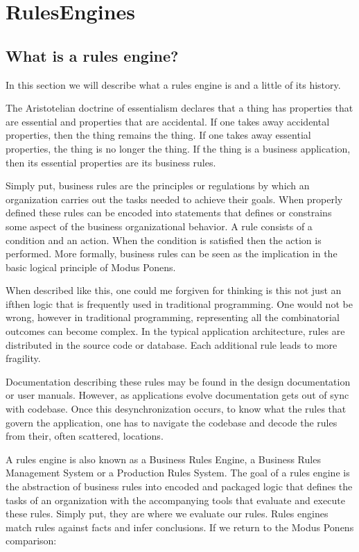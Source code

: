 \section{RulesEngines}

\subsection{What is a rules engine?}

In this section we will describe what a rules engine is and a little of its history.

The Aristotelian doctrine of essentialism declares that a thing has properties that are essential and properties that are accidental.
If one takes away accidental properties, then the thing remains the thing.
If one takes away essential properties, the thing is no longer the thing.
If the thing is a business application, then its essential properties are its business rules.


Simply put, business rules are the principles or regulations by which an organization carries out the tasks needed to achieve their goals.
When properly defined these rules can be encoded into statements that defines or constrains some aspect of the business organizational behavior.
A rule consists of a condition and an action.
When the condition is satisfied then the action is performed.
More formally, business rules can be seen as the implication in the basic logical principle of Modus Ponens.

When described like this, one could me forgiven for thinking is this not just an if\-then logic that is frequently used in traditional programming.
One would not be wrong, however in traditional programming, representing all the combinatorial outcomes can become complex.
In the typical application architecture, rules are distributed in the source code or database.
Each additional rule leads to more fragility.

Documentation describing these rules may be found in the design documentation or user manuals.
However, as applications evolve documentation gets out of sync with codebase.
Once this desynchronization occurs, to know what the rules that govern the application, one has to navigate the codebase and decode the rules from their, often scattered, locations.

A rules engine is also known as a Business Rules Engine, a Business Rules Management System or a Production Rules System.
The goal of a rules engine  is the abstraction of business rules into encoded and packaged logic that defines the tasks of an organization with the accompanying tools that evaluate and execute these rules.
Simply put, they are where we evaluate our rules.
Rules engines match rules against facts and infer conclusions.
If we return to the Modus Ponens comparison:


